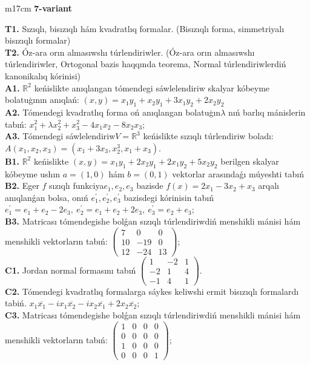 \documentclass{article}
\begin{document}
\begin{tabular}{m{17cm}}
\textbf{7-variant}
\newline

\textbf{T1.} Sızıqlı, bisızıqlı hám kvadratlıq formalar. (Bisızıqlı forma,  simmetriyalı bisızıqlı formalar)  \\
\textbf{T2.} Óz-ara orın almasıwshı túrlendiriwler. (Óz-ara orın almasıwshı túrlendiriwler,  Ortogonal bazis haqqında teorema,  Normal túrlendiriwlerdiń kanonikalıq kórinisi) \\
\textbf{A1.} \(\mathbb{R}^{2}\) keńislikte anıqlangan tómendegi sáwlelendiriw skalyar kóbeyme bolatuģının anıqlań: \((x,y) = x_{1}y_{1} + x_{2}y_{1} + 3x_{1}y_{2} + 2x_{2}y_{2}\) \\
\textbf{A2.} Tómendegi kvadratlıq forma oń anıqlangan bolatuģın\(\lambda\) nıń barlıq mánislerin tabıń: \(x_{1}^{2} + \lambda x_{2}^{2} + x_{3}^{2} - 4x_{1}x_{2} - 8x_{2}x_{3}\); \\
\textbf{A3.} Tómendegi sáwlelendiriw\(V = \mathbb{R}^{3}\) keńislikte sızıqlı túrlendiriw boladı: \(A\left( x_{1},x_{2},x_{3} \right) = \left( x_{1} + 3x_{3},x_{2}^{3},x_{1} + x_{3} \right)\). \\
\textbf{B1.} \(\mathbb{R}^{2}\) keńislikte \((x,y) = x_{1}y_{1} + 2x_{2}y_{1} + 2x_{1}y_{2} + 5x_{2}y_{2}\) berilgen skalyar kóbeyme ushın \(a = (1,0)\) hám \(b = (0,1)\) vektorlar arasındaǵı múyeshti tabıń \\
\textbf{B2.} Eger \(f\) sızıqlı funkciya\(e_{1},e_{2},e_{3}\) bazisde \(f(x) = 2x_{1} - 3x_{2} + x_{3}\) arqalı anıqlanǵan bolsa, onıń \(e_{1}^{'},e_{2}^{'},e_{3}^{'}\) bazisdegi kórinisin tabıń\(e_{1}^{'} = e_{1} + e_{2} - 2e_{3},\ e_{2}^{'} = e_{1} + e_{2} + 2e_{3},\ e_{3}^{'} = e_{2} + e_{3}\); \\
\textbf{B3.} Matricası tómendegishe bolǵan sızıqlı túrlendiriwdiń menshikli mánisi hám menshikli vektorların tabıń: \(\begin{pmatrix} 7 & 0 & 0 \\ 10 & - 19 & 0 \\ 12 & - 24 & 13 \end{pmatrix}\); \\
\textbf{C1.} Jordan normal formasını tabıń \(\begin{pmatrix} 1 & - 2 & 1 \\  - 2 & 1 & 4 \\  - 1 & 4 & 1 \end{pmatrix}\). \\
\textbf{C2.} Tómendegi kvadratlıq formalarga sáykes keliwshi ermit bisızıqlı formalardı tabiń. \(x_{1}\overline{x_{1}} - ix_{1}\overline{x_{2}} - ix_{2}\overline{x_{1}} + 2x_{2}\overline{x_{2}}\); \\
\textbf{C3.} Matricası tómendegishe bolǵan sızıqlı túrlendiriwdiń menshikli mánisi hám menshikli vektorların tabıń: \(\begin{pmatrix} 1 & 0 & 0 & 0 \\ 0 & 0 & 0 & 0 \\ 1 & 0 & 0 & 0 \\ 0 & 0 & 0 & 1 \end{pmatrix}\); \\

\end{tabular}
\end{document}
